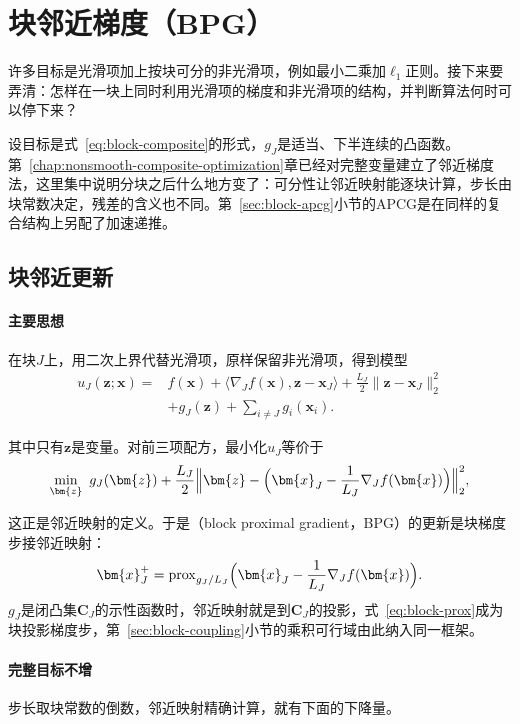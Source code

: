 \section{块邻近梯度（BPG）}
\label{sec:block-bpg}

许多目标是光滑项加上按块可分的非光滑项，例如最小二乘加$\ell_1$正则。接下来要弄清：怎样在一块上同时利用光滑项的梯度和非光滑项的结构，并判断算法何时可以停下来？

设目标是式~\eqref{eq:block-composite}的形式，$g_J$是适当、下半连续的凸函数。第~\ref{chap:nonsmooth-composite-optimization}章已经对完整变量建立了邻近梯度法，这里集中说明分块之后什么地方变了：可分性让邻近映射能逐块计算，步长由块常数决定，残差的含义也不同。第~\ref{sec:block-apcg}小节的APCG是在同样的复合结构上另配了加速递推。

\subsection{块邻近更新}
\label{sec:block-prox-update}

\paragraph{主要思想}
在块$J$上，用二次上界代替光滑项，原样保留非光滑项，得到模型
\begin{equation}
 \begin{aligned}
 u_J(\bm{z};\bm{x})={}&f(\bm{x})+\langle\nabla_Jf(\bm{x}),\bm{z}-\bm{x}_J\rangle+\frac{L_J}{2}\lVert\bm{z}-\bm{x}_J\rVert_2^2\\
 &+g_J(\bm{z})+\sum_{i\neq J}g_i(\bm{x}_i).
 \end{aligned}
 \label{eq:block-prox-model}
\end{equation}

其中只有$\bm{z}$是变量。对前三项配方，最小化$u_J$等价于
\[
 \min_{\bm{z}}\ g_J(\bm{z})+\frac{L_J}{2}\Bigl\lVert\bm{z}-\Bigl(\bm{x}_J-\frac{1}{L_J}\nabla_Jf(\bm{x})\Bigr)\Bigr\rVert_2^2 ,
\]

这正是邻近映射的定义。于是（block proximal gradient，BPG）的更新是块梯度步接邻近映射：
\begin{equation}
 \bm{x}_J^{+}=\operatorname{prox}_{g_J/L_J}\Bigl(\bm{x}_J-\frac{1}{L_J}\nabla_Jf(\bm{x})\Bigr).
 \label{eq:block-prox}
\end{equation}
$g_J$是闭凸集$\bm{C}_J$的示性函数时，邻近映射就是到$\bm{C}_J$的投影，式~\eqref{eq:block-prox}成为块投影梯度步，第~\ref{sec:block-coupling}小节的乘积可行域由此纳入同一框架。

\paragraph{完整目标不增}
步长取块常数的倒数，邻近映射精确计算，就有下面的下降量。

